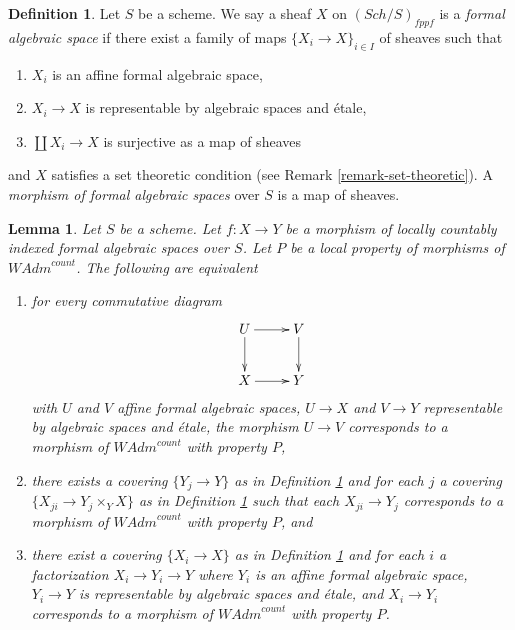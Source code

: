 \documentclass{stacks-project}
\theoremstyle{plain}
\newtheorem{lemma}[subsection]{Lemma}
\theoremstyle{definition}
\newtheorem{definition}[subsection]{Definition}
\theoremstyle{remark}
\numberwithin{equation}{subsection}
\def\Sch{\mathit{Sch}}
\begin{document}
\begin{definition}
\label{definition-formal-algebraic-space}
Let $S$ be a scheme. We say a sheaf $X$ on $(\Sch/S)_{fppf}$ is a
{\it formal algebraic space} if there exist a family of maps
$\{X_i \to X\}_{i \in I}$ of sheaves such that
\begin{enumerate}
\item $X_i$ is an affine formal algebraic space,
\item $X_i \to X$ is representable by algebraic spaces and \'etale,
\item $\coprod X_i \to X$ is surjective as a map of sheaves
\end{enumerate}
and $X$ satisfies a set theoretic condition
(see Remark \ref{remark-set-theoretic}). A
{\it morphism of formal algebraic spaces}
over $S$ is a map of sheaves.
\end{definition}

\begin{lemma}
\label{lemma-property-defines-property-morphisms}
Let $S$ be a scheme. Let $f : X \to Y$ be a morphism of
locally countably indexed formal algebraic spaces over $S$.
Let $P$ be a local property of morphisms of $\textit{WAdm}^{count}$.
The following are equivalent
\begin{enumerate}
\item for every commutative diagram
$$
\xymatrix{
U \ar[d] \ar[r] & V \ar[d] \\
X \ar[r] & Y
}
$$
with $U$ and $V$ affine formal algebraic spaces, $U \to X$ and $V \to Y$
representable by algebraic spaces and \'etale, the morphism $U \to V$
corresponds to a morphism of $\textit{WAdm}^{count}$ with property $P$,
\item there exists a covering $\{Y_j \to Y\}$ as in
Definition \ref{definition-formal-algebraic-space} and for each $j$
a covering $\{X_{ji} \to Y_j \times_Y X\}$ as in
Definition \ref{definition-formal-algebraic-space}
such that each $X_{ji} \to Y_j$  corresponds
to a morphism of $\textit{WAdm}^{count}$ with property $P$, and
\item there exist a covering $\{X_i \to X\}$ as in
Definition \ref{definition-formal-algebraic-space}
and for each $i$ a factorization $X_i \to Y_i \to Y$ where $Y_i$
is an affine formal algebraic space, $Y_i \to Y$ is representable
by algebraic spaces and \'etale, and $X_i \to Y_i$ corresponds
to a morphism of $\textit{WAdm}^{count}$ with property $P$.
\end{enumerate}
\end{lemma}
\end{document}
